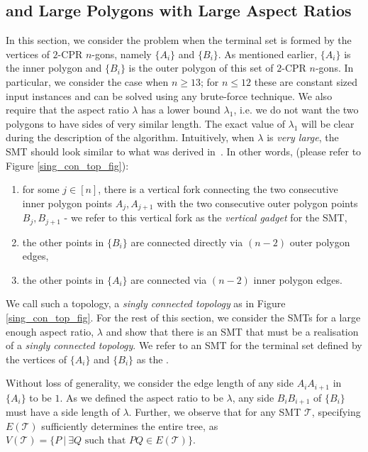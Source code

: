 
\subsection{\ESMT and Large Polygons with Large Aspect Ratios} \label{final_proofs}


In this section, we consider the \ESMT problem when the terminal set is formed by the vertices of $2$-CPR $n$-gons, namely $\{A_i\}$ and $\{B_i\}$. As mentioned earlier, $\{A_i\}$ is the inner polygon and $\{B_i\}$ is the outer polygon of this set of $2$-CPR $n$-gons. In particular, we consider the case when $n \geq 13$; for $n \leq 12$ these are constant sized input instances and can be solved using any brute-force technique. We also require that the aspect ratio 
$\lambda$ has a lower bound $\lambda_1$, i.e. we do not want the two polygons to have sides of very similar length. The exact value of  $\lambda_1$ will be clear during the description of the algorithm. Intuitively, when $\lambda$ is \emph{very large}, the SMT should look similar to what was derived in~\cite{weng1995steiner}. In other words, (please refer to Figure \ref{sing_con_top_fig}):
\begin{enumerate}
    \item for some $j \in [n]$, there is a  vertical fork connecting the two consecutive inner polygon points $A_j, A_{j + 1}$  with the two consecutive outer polygon points $B_j, B_{j + 1}$ - we refer to this vertical fork as the \emph{vertical gadget} for the SMT,
    \item the other points in $\{B_i\}$ are connected directly via $(n - 2)$ outer polygon edges,
    \item the other points in $\{A_i\}$ are connected via $(n - 2)$ inner polygon edges. 
\end{enumerate}

We call such a topology, a \emph{singly connected topology} as in Figure \ref{sing_con_top_fig}. 
For the rest of this section, we consider the SMTs for a large enough aspect ratio, $\lambda$ and show that there is an SMT that must be a realisation of a \emph{singly connected topology}. We refer to an SMT for the terminal set defined by the vertices of $\{A_i\}$ and $\{B_i\}$ as the \smtpoly. 

Without loss of generality, we consider the edge length of any side $A_iA_{i+1}$ in $\{A_i\}$ to be $1$. As we defined the aspect ratio to be $\lambda$, any side $B_iB_{i+1}$ of $\{B_i\}$ must have a side length of $\lambda$. Further, we observe that for any SMT $\mathcal T$, specifying $E(\mathcal T)$ sufficiently determines the entire tree, as $V(\mathcal T) = \{P~|~\exists Q \text{ such that } PQ \in E(\mathcal T)\}$.

